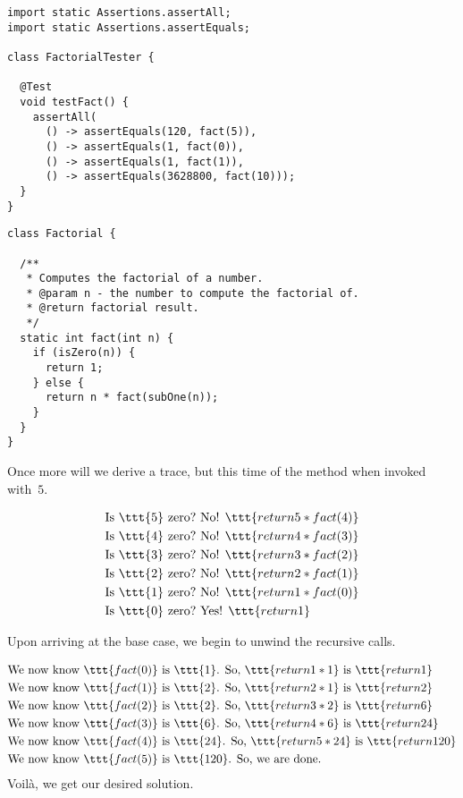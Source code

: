 \enlargethispage{-5\baselineskip}
\begin{lstlisting}[language=MyJava]
import static Assertions.assertAll;
import static Assertions.assertEquals;

class FactorialTester {
  
  @Test
  void testFact() {
    assertAll(
      () -> assertEquals(120, fact(5)),
      () -> assertEquals(1, fact(0)),
      () -> assertEquals(1, fact(1)),
      () -> assertEquals(3628800, fact(10)));
  }
}
\end{lstlisting}
\begin{lstlisting}[language=MyJava]
class Factorial {

  /**
   * Computes the factorial of a number.
   * @param n - the number to compute the factorial of.
   * @return factorial result.
   */
  static int fact(int n) {
    if (isZero(n)) {
      return 1;
    } else {
      return n * fact(subOne(n));
    }
  }
}
\end{lstlisting}

Once more will we derive a trace, but this time of the  method when invoked with~$5$.

\begin{align*}
    \text{Is }\ttt{5} \text{ zero?} &\text{ No! }\ttt{return 5 * fact(4)}\\
    \text{Is }\ttt{4} \text{ zero?} &\text{ No! }\ttt{return 4 * fact(3)}\\
    \text{Is }\ttt{3} \text{ zero?} &\text{ No! }\ttt{return 3 * fact(2)}\\
    \text{Is }\ttt{2} \text{ zero?} &\text{ No! }\ttt{return 2 * fact(1)}\\
    \text{Is }\ttt{1} \text{ zero?} &\text{ No! }\ttt{return 1 * fact(0)}\\
    \text{Is }\ttt{0} \text{ zero?} &\text{ Yes! }\ttt{return 1}
\end{align*}

Upon arriving at the base case, we begin to unwind the recursive calls.

\begin{align*}
    &\text{We now know }\ttt{fact(0)} \text{ is }\ttt{1}\text{. So, } \ttt{return 1 * 1} \text{ is } \ttt{return 1}\\
    &\text{We now know }\ttt{fact(1)} \text{ is }\ttt{2}\text{. So, } \ttt{return 2 * 1} \text{ is } \ttt{return 2}\\
    &\text{We now know }\ttt{fact(2)} \text{ is }\ttt{2}\text{. So, } \ttt{return 3 * 2} \text{ is } \ttt{return 6}\\
    &\text{We now know }\ttt{fact(3)} \text{ is }\ttt{6}\text{. So, } \ttt{return 4 * 6} \text{ is } \ttt{return 24}\\
    &\text{We now know }\ttt{fact(4)} \text{ is }\ttt{24}\text{. So, } \ttt{return 5 * 24} \text{ is } \ttt{return 120}\\
    &\text{We now know }\ttt{fact(5)} \text{ is }\ttt{120}\text{. So, } \text{we are done.} 
\end{align*}
Voil\`a, we get our desired solution.

